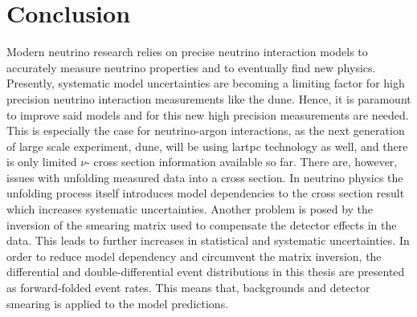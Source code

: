 \chapter{Conclusion} \label{sec:conclusion}
Modern neutrino research relies on precise neutrino interaction models to accurately measure neutrino properties and to eventually find new physics. Presently, systematic model uncertainties are becoming a limiting factor for high precision neutrino interaction measurements like the \gls{dune}. Hence, it is paramount to improve said models and for this new high precision measurements are needed. This is especially the case for neutrino-argon interactions, as the next generation of large scale experiment, \ie \gls{dune}, will be using \gls{lartpc} technology as well, and there is only limited $\nu$- cross section information available so far. There are, however, issues with unfolding measured data into a cross section. In neutrino physics the unfolding process itself introduces model dependencies to the cross section result which increases systematic uncertainties. Another problem is posed by the inversion of the smearing matrix used to compensate the detector effects in the data. This leads to further increases in statistical and systematic uncertainties. In order to reduce model dependency and circumvent the matrix inversion, the differential and double-differential event distributions in this thesis are presented as forward-folded event rates. This means that, backgrounds and detector smearing is applied to the model predictions.

